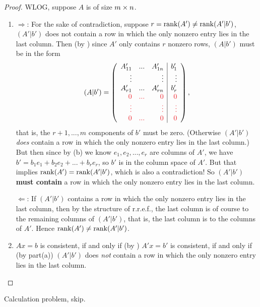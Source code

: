 \begin{proof}
WLOG, suppose \(A\) is of size \(m \times n\).
\begin{enumerate}
\item
\(\Longrightarrow\): For the sake of contradiction, suppose \(r = \mathrm{rank}(A') \ne \mathrm{rank}(A'|b')\),  \((A'|b')\) does not contain a row in which the only nonzero entry lies in the last column.
Then (by ) since \(A'\) only contains \(r\) nonzero rows, \((A|b')\) must be in the form
\[
    (A|b') =
    \left(\begin{array}{rrr|r}
             A'_{11} &       ... &      A'_{1n} & b'_1 \\
              \vdots &           &       \vdots & \vdots \\
             A'_{r1} &       ... &      A'_{rn} & b'_r \\
             \RED{0} & \RED{...} &      \RED{0} & \RED{0} \\
        \RED{\vdots} &           & \RED{\vdots} & \RED{\vdots} \\
             \RED{0} & \RED{...} &      \RED{0} & \RED{0}
    \end{array}\right),
\]
that is, the \(r + 1, ..., m\) components of \(b'\) must be zero. (Otherwise \((A'|b')\) \emph{does} contain a row in which the only nonzero entry lies in the last column.)
But then since by (b) we know \(e_1, e_2, ..., e_r\) are columns of \(A'\), we have \(b' = b_1 e_1 + b_2 e_2 + ... + b_r e_r\), so \(b'\) is in the column space of \(A'\).
But that implies \(\mathrm{rank}(A') = \mathrm{rank}(A'|b')\), which is also a contradiction!
So \((A'|b')\) \textbf{must contain} a row in which the only nonzero entry lies in the last column.

\(\Longleftarrow\):
If \((A'|b')\) contains a row in which the only nonzero entry lies in the last column, then by the structure of r.r.e.f., the last column is of course \LID{} to the remaining columns of \((A'|b')\), that is, the last column is \LID{} to the columns of \(A'\).
Hence \(\mathrm{rank}(A') \ne \mathrm{rank}(A'|b')\).

\item \(Ax = b\) is consistent, if and only if (by ) \(A'x = b'\) is consistent, if and only if (by part(a)) \((A'|b')\) does \emph{not} contain a row in which the only nonzero entry lies in the last column.
\end{enumerate}
\end{proof}

\begin{exercise} \label{exercise 3.4.4}
Calculation problem, skip.
\end{exercise}


